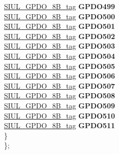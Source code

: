 \begin{DoxyCompactItemize}
\begin{tabbing}
\>\>\mbox{\hyperlink{unionSIUL__GPDO__8B__tag}{SIUL\_GPDO\_8B\_tag}} {\bfseries GPDO499}\\
\>\>\mbox{\hyperlink{unionSIUL__GPDO__8B__tag}{SIUL\_GPDO\_8B\_tag}} {\bfseries GPDO500}\\
\>\>\mbox{\hyperlink{unionSIUL__GPDO__8B__tag}{SIUL\_GPDO\_8B\_tag}} {\bfseries GPDO501}\\
\>\>\mbox{\hyperlink{unionSIUL__GPDO__8B__tag}{SIUL\_GPDO\_8B\_tag}} {\bfseries GPDO502}\\
\>\>\mbox{\hyperlink{unionSIUL__GPDO__8B__tag}{SIUL\_GPDO\_8B\_tag}} {\bfseries GPDO503}\\
\>\>\mbox{\hyperlink{unionSIUL__GPDO__8B__tag}{SIUL\_GPDO\_8B\_tag}} {\bfseries GPDO504}\\
\>\>\mbox{\hyperlink{unionSIUL__GPDO__8B__tag}{SIUL\_GPDO\_8B\_tag}} {\bfseries GPDO505}\\
\>\>\mbox{\hyperlink{unionSIUL__GPDO__8B__tag}{SIUL\_GPDO\_8B\_tag}} {\bfseries GPDO506}\\
\>\>\mbox{\hyperlink{unionSIUL__GPDO__8B__tag}{SIUL\_GPDO\_8B\_tag}} {\bfseries GPDO507}\\
\>\>\mbox{\hyperlink{unionSIUL__GPDO__8B__tag}{SIUL\_GPDO\_8B\_tag}} {\bfseries GPDO508}\\
\>\>\mbox{\hyperlink{unionSIUL__GPDO__8B__tag}{SIUL\_GPDO\_8B\_tag}} {\bfseries GPDO509}\\
\>\>\mbox{\hyperlink{unionSIUL__GPDO__8B__tag}{SIUL\_GPDO\_8B\_tag}} {\bfseries GPDO510}\\
\>\>\mbox{\hyperlink{unionSIUL__GPDO__8B__tag}{SIUL\_GPDO\_8B\_tag}} {\bfseries GPDO511}\\
\>\} \\
\}; \\


\end{tabbing}
\end{DoxyCompactItemize}
